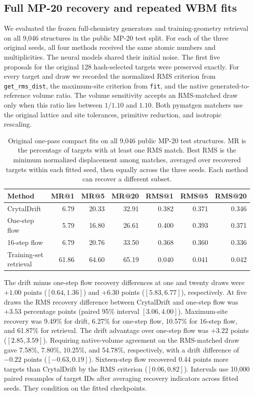 \subsection{Full MP-20 recovery and repeated WBM fits}\label{s:revision-scale}
We evaluated the frozen full-chemistry generators and training-geometry retrieval on all 9,046 structures in the public MP-20 test split. For each of the three original seeds, all four methods received the same atomic numbers and multiplicities. The neural models shared their initial noise. The first five proposals for the original 128 hash-selected targets were preserved exactly. For every target and draw we recorded the normalized RMS criterion from \texttt{get\_rms\_dist}, the maximum-site criterion from \texttt{fit}, and the native generated-to-reference volume ratio. The volume sensitivity accepts an RMS-matched draw only when this ratio lies between $1/1.10$ and $1.10$. Both pymatgen matchers use the original lattice and site tolerances, primitive reduction, and isotropic rescaling.

\begin{table}[!htbp]\centering\small
\caption{Original one-pass compact fits on all 9,046 public MP-20 test structures. MR is the percentage of targets with at least one RMS match. Best RMS is the minimum normalized displacement among matches, averaged over recovered targets within each fitted seed, then equally across the three seeds. Each method can recover a different subset.}\label{t:full-mp20-revision}
\begin{tabular}{lrrrrrr}\hline
Method & MR@1 & MR@5 & MR@20 & RMS@1 & RMS@5 & RMS@20\\\hline
CrytalDrift & 6.79 & 20.33 & 32.91 & 0.382 & 0.371 & 0.346\\
One-step flow & 5.79 & 16.80 & 26.61 & 0.400 & 0.393 & 0.371\\
16-step flow & 6.79 & 20.76 & 33.50 & 0.368 & 0.360 & 0.336\\
Training-set retrieval & 61.86 & 64.60 & 65.19 & 0.040 & 0.041 & 0.042\\
\hline\end{tabular}\end{table}

The drift minus one-step flow recovery differences at one and twenty draws were $+1.00$ points ($[0.64,1.36]$) and $+6.30$ points ($[5.83,6.77]$), respectively.
At five draws the RMS recovery difference between CrytalDrift and one-step flow was $+3.53$ percentage points (paired 95\% interval $[3.06,4.00]$). Maximum-site recovery was 9.49\% for drift, 6.27\% for one-step flow, 10.57\% for 16-step flow, and 61.87\% for retrieval. The drift advantage over one-step flow was $+3.22$ points ($[2.85,3.59]$). Requiring native-volume agreement on the RMS-matched draw gave 7.58\%, 7.80\%, 10.25\%, and 54.78\%, respectively, with a drift difference of $-0.22$ points ($[-0.63,0.19]$). Sixteen-step flow recovered $0.44$ points more targets than CrytalDrift by the RMS criterion ($[0.06,0.82]$). Intervals use 10,000 paired resamples of target IDs after averaging recovery indicators across fitted seeds. They condition on the fitted checkpoints.

